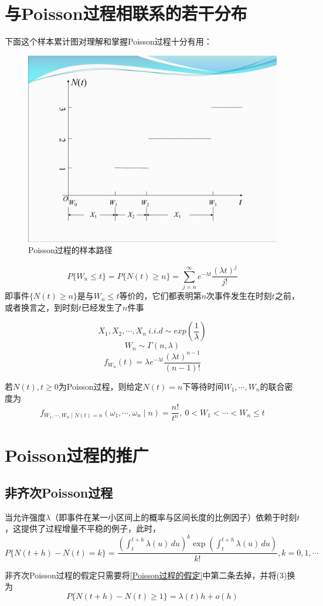 \documentclass[]{report}
\begin{document}
	\section{与Poisson过程相联系的若干分布}
		下面这个样本累计图对理解和掌握Poisson过程十分有用：
		\begin{figure}[ht!]
			\centering
			\begin{minipage}{40em}
				\centering
				\includegraphics[scale = 0.5]{images/Poisson过程的样本路径.pdf}
				\caption{Poisson过程的样本路径}
			\end{minipage}
		\end{figure}
		\begin{theorem}[一条很重要的性质]
		\[\boxed{P\{W_n\le t\}=P\{N(t)\ge n\}=\sum_{j=n}^\infty e^{-\lambda t}\frac{(\lambda t)^j}{j!}}\]
		即事件$\{N(t)\ge n\}$是与$W_n\le t$等价的，它们都表明第$n$次事件发生在时刻$t$之前，或者换言之，到时刻$t$已经发生了$n$件事
		\end{theorem}
		\[X_1,X_2,\cdots,X_n\ i.i.d\sim exp(\frac{1}{\lambda})\]
		\[W_n\sim\varGamma(n,\lambda)\]
		\[f_{W_n}(t)=\lambda e^{-\lambda t}\frac{(\lambda t)^{n-1}}{(n-1)!}\]
		\begin{theorem}
			若$N(t),t\ge0$为Poisson过程，则给定$N(t)=n$下等待时间$W_1,\cdots,W_n$的联合密度为
			\[f_{W_1,\cdots,W_n\mid N(t)=n}(\omega_1,\cdots,\omega_n\mid n)=\frac{n!}{t^n},\ 0<W_1<\cdots<W_n\le t\]
		\end{theorem}
	\section{Poisson过程的推广}
		\subsection{非齐次Poisson过程}
			当允许强度$\lambda$（即事件在某一小区间上的概率与区间长度的比例因子）依赖于时刻$t$，这提供了过程增量不平稳的例子，此时，
			\[P\{N(t+h)-N(t)=k\}=\frac{(\int_{t}^{t+h}\lambda(u)\,du)^k\exp(\int_{t}^{t+h}\lambda(u)\,du)}{k!},k=0,1,\cdots\]\par
			非齐次Poisson过程的假定只需要将\ref{Poisson过程的假定}中第二条去掉，并将(3)换为
			\[P\{N(t+h)-N(t)\ge1\}=\lambda(t)h+o(h)\]
\end{document}
